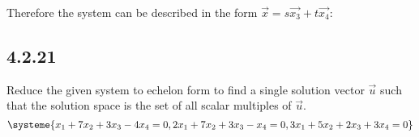 \documentclass{article}
\begin{document}
Therefore the system can be described in the form $ \vec{x} = s\vec{x_3} + t\vec{x_4} $:

\subsection{4.2.21}

Reduce the given system to echelon form to find a single solution vector $ \vec{u} $ such that the solution space is the set of all scalar multiples of $ \vec{u} $.
\begin{equation*}
	\systeme{
		x_1 + 7x_2 + 3x_3 - 4x_4 = 0,
		2x_1 + 7x_2 + 3x_3 - x_4 = 0,
		3x_1 + 5x_2 + 2x_3 + 3x_4 = 0
	}
\end{equation*}
\end{document}
